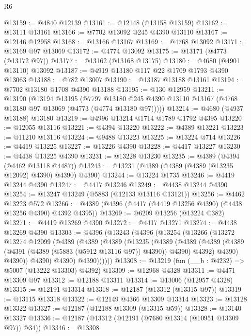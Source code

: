 \begin{lexlean}{R6}
\begin{coremodule}
@13159 := @4840 @12139
@13161 := @12148 (@13158 @13159)
@13162 := @13111 @13161
@13166 := @7702 @13092 @245 @4390 @13110
@13167 := @12146 @12958
@13168 := @13166 @13167
@13169 := @4768 @13092
@13171 := @13169 @97 @13069
@13172 := @4774 @13092
@13175 := @13171 (@4773 (@13172 @97))
@13177 := @13162 (@13168 @13175)
@13180 := @4680 (@4901 @13110) @13092
@13187 := @4919 @13180 @117 @22 @1709 @1793 @4390 @13063
@13188 := @782 @13007
@13190 := @13187 @13188 @13161
@13194 := @7702 @13180 @1708 @4390 @13188
@13195 := @130 @12959
@13211 := @13190
    (@13194
      @13195
      (@7797 @13180 @245 @4390 @13110 @13167 (@4768 @13180 @97 @13069 (@4773 (@4774 @13180 @97)))))
@13214 := @4680 (@4937 @13188) @13180
@13219 := @4996 @13214 @1714 @1789 @1792 @4395
@13220 := @12055 @13116
@13221 := @4394 @13220
@13222 := @4389 @13221
@13223 := @11210 @13116
@13224 := @9488 @13223
@13225 := @13224 @714
@13226 := @4419 @13225
@13227 := @13226 @4390
@13228 := @4417 @13227
@13230 := @4438 @13225 @4390
@13231 := @13228 @13230
@13235 := @4389 (@4394 (@4462 @13118 @4487))
@13243 := @13231 (@4389 (@4389 (@4389 (@13235 @12092) @4390) @4390) @4390)
@13244 := @13224 @1735
@13246 := @4419 @13244 @4390
@13247 := @4417 @13246
@13249 := @4438 @13244 @4390
@13254 := @13247 @13249 (@5883 (@12133 @13116 @13121))
@13256 := @4462 @13223 @572
@13266 := @4389 (@4396 (@4417 (@4419 @13256 @4390) (@4438 @13256 @4390) @4392 @4395))
@13269 := @6209 @13256 (@13224 @382)
@13271 := @4419 @13269 @4390
@13272 := @4417 @13271
@13274 := @4438 @13269 @4390
@13303 := @4396
    (@13243
      (@4396
        (@13254
          (@13266
            (@13272
              @13274
              @12099
              (@4389
                (@4389
                  (@4389
                    (@13235
                      (@4389
                        (@4389
                          (@4389
                            (@4389 (@4391 (@4389 (@5883 (@5912 @13116 @97)) @4390)) @4390)
                            @4392)
                          @4390)
                        @4390))
                    @4390)
                  @4390)
                @4390))))))
@13308 := @13219 (fun (__b : @4232) => @5007 (@13222 @13303) @4392)
@13309 := @12968 @4328
@13311 := @4471 @13309 @97
@13312 := @12188 @13311
@13314 := @13006 (@12957 @4328)
@13315 := @12191 @13314
@13318 := @12187 (@13312 (@13315 @97))
@13319 := @13115 @13318
@13322 := @12149 @4366 @13309 @13314
@13323 := @13128 @13322
@13327 := @12187 (@12188 @13309 (@13315 @59))
@13328 := @13140 @13327
@13336 := @12187 (@13312 (@12191 (@7680 @13314 (@10951 @13309 @97)) @34))
@13346 := @13308

\end{coremodule}
\end{lexlean}
